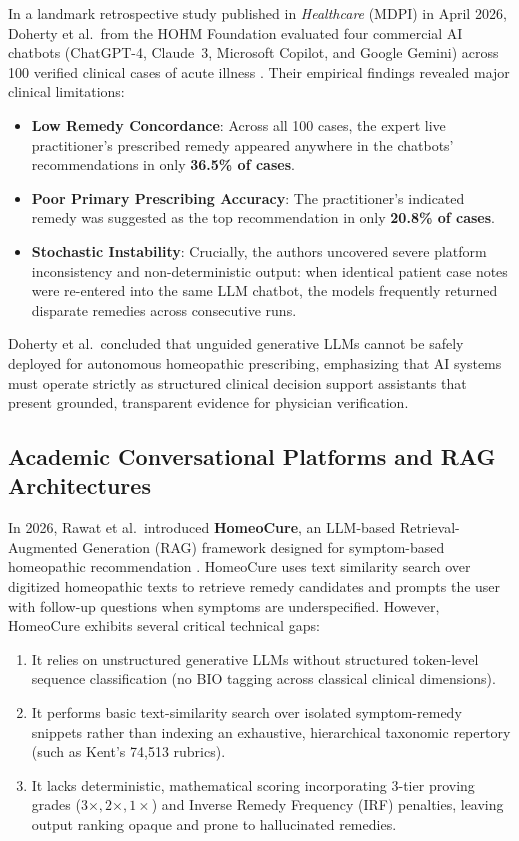 \begin{sloppypar}
In a landmark retrospective study published in \emph{Healthcare} (MDPI) in April 2026, Doherty et al.~from the HOHM Foundation evaluated four commercial AI chatbots (ChatGPT-4, Claude~3, Microsoft Copilot, and Google Gemini) across 100 verified clinical cases of acute illness \cite{Doherty2026_HOHM}. Their empirical findings revealed major clinical limitations:
\begin{itemize}
    \item \textbf{Low Remedy Concordance}: Across all 100 cases, the expert live practitioner's prescribed remedy appeared anywhere in the chatbots' recommendations in only \textbf{36.5\% of cases}.
    \item \textbf{Poor Primary Prescribing Accuracy}: The practitioner's indicated remedy was suggested as the top recommendation in only \textbf{20.8\% of cases}.
    \item \textbf{Stochastic Instability}: Crucially, the authors uncovered severe platform inconsistency and non-deterministic output: when identical patient case notes were re-entered into the same LLM chatbot, the models frequently returned disparate remedies across consecutive runs.
\end{itemize}
Doherty et al.~concluded that unguided generative LLMs cannot be safely deployed for autonomous homeopathic prescribing, emphasizing that AI systems must operate strictly as structured clinical decision support assistants that present grounded, transparent evidence for physician verification.

\subsection{Academic Conversational Platforms and RAG Architectures}
In 2026, Rawat et al.~introduced \textbf{HomeoCure}, an LLM-based Retrieval-Augmented Generation (RAG) framework designed for symptom-based homeopathic recommendation \cite{Rawat2026_HomeoCure}. HomeoCure uses text similarity search over digitized homeopathic texts to retrieve remedy candidates and prompts the user with follow-up questions when symptoms are underspecified. However, HomeoCure exhibits several critical technical gaps:
\begin{enumerate}
    \item It relies on unstructured generative LLMs without structured token-level sequence classification (no BIO tagging across classical clinical dimensions).
    \item It performs basic text-similarity search over isolated symptom-remedy snippets rather than indexing an exhaustive, hierarchical taxonomic repertory (such as Kent's 74,513 rubrics).
    \item It lacks deterministic, mathematical scoring incorporating 3-tier proving grades ($3\times, 2\times, 1\times$) and Inverse Remedy Frequency (IRF) penalties, leaving output ranking opaque and prone to hallucinated remedies.
\end{enumerate}


\end{sloppypar}
